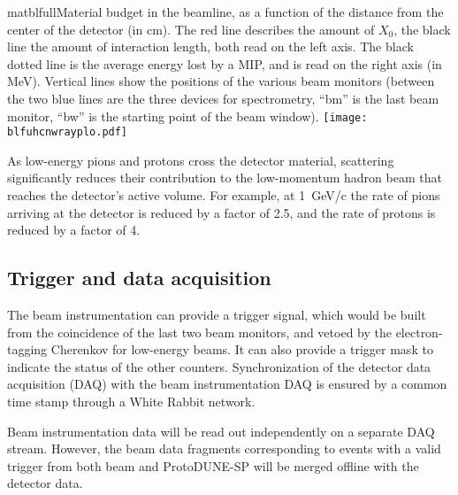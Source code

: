   
 \begin{cdrfigure}{matblfull}{Material budget in the beamline, as a function of the distance from the center of the detector (in cm). The red line describes the amount of $X_0$, the black line the amount of interaction length, both read on the left axis. The black dotted line is the average energy lost by a MIP, and is read on the right axis (in MeV). Vertical lines show the positions of the various beam monitors (between the two blue lines are the three devices for spectrometry, ``bm'' is the last beam monitor, ``bw'' is the starting point of the beam window).}  
\texttt{[image: blfuhcnwrayplo.pdf]}
\end{cdrfigure}
 
As low-energy pions and protons cross the detector material, scattering significantly reduces their contribution to the low-momentum hadron beam that reaches the detector's active volume. 
For example, at 1~GeV/c the rate of pions arriving at the detector is reduced by a factor of 2.5, and the rate of protons is reduced by a factor of 4. 


\subsection {Trigger and data acquisition}

The beam instrumentation can provide a trigger signal, which would be built from the coincidence of the last two beam monitors, and vetoed by the electron-tagging Cherenkov for low-energy beams. 
It can also provide a trigger mask to indicate the status of the other counters. 
 Synchronization of the detector data acquisition (DAQ) with the beam instrumentation DAQ is ensured by a common time stamp through a White Rabbit network.

Beam instrumentation data will be read out independently on a separate DAQ stream. However,  
the beam data fragments corresponding to  events with a valid trigger from both beam and ProtoDUNE-SP will be merged offline with the detector data.

